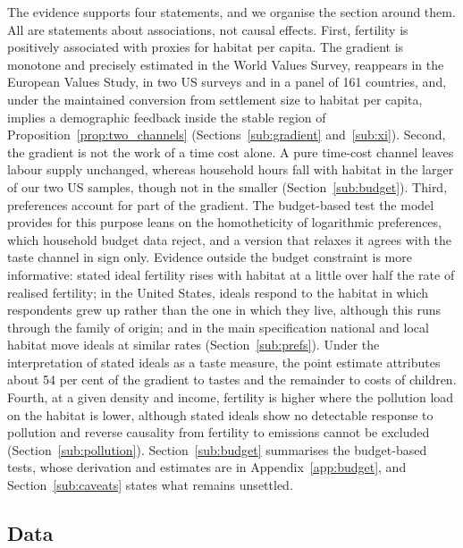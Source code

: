 \documentclass[11pt]{article}
\begin{document}
The evidence supports four statements, and we organise the section around
them. All are statements about associations, not causal effects. First, fertility is positively
associated with proxies for habitat per capita. The gradient is monotone and precisely estimated in the
World Values Survey, reappears in the European Values Study, in two US surveys and in a panel of 161
countries, and, under the maintained conversion from settlement size to habitat per capita, implies a
demographic feedback inside the stable region of Proposition~\ref{prop:two_channels} (Sections~\ref{sub:gradient} and~\ref{sub:xi}). Second, the
gradient is not the work of a time cost alone. A pure time-cost channel leaves labour supply
unchanged, whereas household hours fall with habitat in the larger of our two US samples, though
not in the smaller (Section~\ref{sub:budget}). Third, preferences account for part of the gradient. The budget-based
test the model provides for this purpose leans on the homotheticity of logarithmic preferences,
which household budget data reject, and a version that relaxes it agrees with the taste channel in
sign only. Evidence outside the budget constraint is more informative: stated ideal fertility
rises with habitat at a little over half the rate of realised fertility; in the United States,
ideals respond to the habitat in which respondents grew up rather than the one in which they live,
although this runs through the family of origin; and in the main specification national and local
habitat move ideals at similar rates (Section~\ref{sub:prefs}). Under the interpretation of stated ideals as a taste measure, the point estimate attributes about
54 per cent of the gradient to tastes and the remainder to costs of children. Fourth, at a given density and income, fertility is higher where the pollution load on the habitat is lower, although stated ideals show no detectable response to pollution and reverse causality from fertility
to emissions cannot be excluded (Section~\ref{sub:pollution}). Section~\ref{sub:budget} summarises the
budget-based tests, whose derivation and estimates are in Appendix~\ref{app:budget}, and
Section~\ref{sub:caveats} states what remains unsettled.

\subsection{Data}
\label{sub:data}
\end{document}
